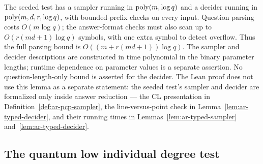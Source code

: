 \begin{lemma}
\label{lem:lidt-effective}
The seeded test has a sampler running in $\mathrm{poly}(m,\log q)$ and a decider
running in $\mathrm{poly}(m,d,r,\log q)$, with bounded-prefix checks on every input.
Question parsing costs $O(m\log q)$; the answer-format checks must also scan
up to $O(r(md+1)\log q)$ symbols, with one extra symbol to detect overflow.
Thus the full parsing bound is $O((m+r(md+1))\log q)$.
The sampler and decider descriptions are constructed in time polynomial in
the binary parameter lengths; runtime dependence on parameter values is a
separate assertion. No question-length-only bound is asserted for the decider.
The Lean proof does not use this lemma as a separate statement: the seeded test's sampler and
decider are formalized only inside answer reduction --- the CL presentation in
Definition~\ref{def:ar-pcp-sampler}, the line-versus-point check in
Lemma~\ref{lem:ar-typed-decider}, and their running times in
Lemmas~\ref{lem:ar-typed-sampler} and~\ref{lem:ar-typed-decider}.
\end{lemma}

\subsection{The quantum low individual degree test}
\label{sec:rr-qld}

\effortHard\ \qlib

